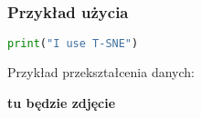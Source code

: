 			
		\subsubsection{Przykład użycia}
			\begin{lstlisting}[language=Python]
				print("I use T-SNE")
			\end{lstlisting}
			
			
			Przykład przekształcenia danych:
			
				\textbf{tu będzie zdjęcie}
	
	






